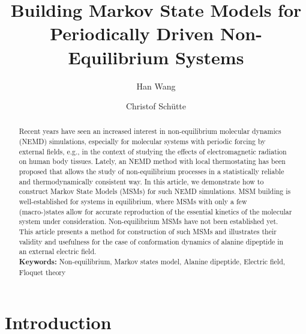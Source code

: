 \documentclass[journal=jctcce,manuscript=article]{achemso}
\title{Building Markov State Models for Periodically Driven Non-Equilibrium Systems}
\author{Han Wang}
\affiliation{CAEP Software Center for High Performance Numerical Simulation, Beijing, China}
\author{Christof Sch\"utte}
\affiliation{Institute for Mathematics, Freie Universit\"at Berlin, Germany}
\begin{document}
   
\begin{abstract}
Recent years have seen an increased interest in non-equilibrium molecular dynamics (NEMD) simulations, especially for molecular systems with periodic forcing by external fields, e.g., in the context of studying the  effects of electromagnetic radiation on human body tissues. Lately, an NEMD method with local thermostating has been proposed that allows the study of 
non-equilibrium processes in a statistically reliable and thermodynamically consistent way. In this article, we demonstrate how to construct Markov State Models (MSMs) for such NEMD simulations. MSM building is well-established for systems in equilibrium, where MSMs with only a few (macro-)states allow for accurate reproduction of the essential kinetics of the molecular system under consideration. Non-equilibrium MSMs have not been established yet. This article presents a method for construction of such MSMs and illustrates their validity and usefulness for the case of conformation dynamics of alanine dipeptide in an external electric field.  \\
\textbf{Keywords:} {Non-equilibrium, Markov states model, Alanine dipeptide, Electric field, Floquet theory}
\end{abstract}


\maketitle

\section{Introduction}
\end{document}
